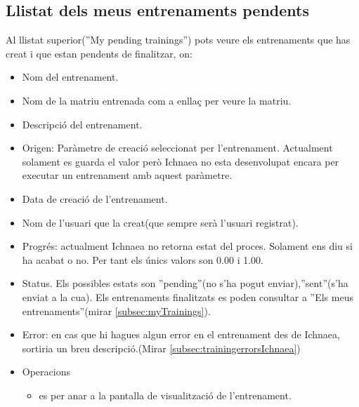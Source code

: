 \subsection{Llistat dels meus entrenaments pendents}
Al llistat superior(''My pending trainings'') pots veure els entrenaments que has creat i que estan pendents de finalitzar, on: 
\begin{itemize}
\item Nom del entrenament.
\item Nom de la matriu entrenada com a enllaç per veure la matriu.
\item Descripci\'{o} del entrenament.
\item Origen: Paràmetre de creació seleccionat per l'entrenament. Actualment solament es guarda el valor però Ichnaea no esta desenvolupat encara per executar un entrenament amb aquest paràmetre.
\item Data de creaci\'{o} de l'entrenament.
\item Nom de l'usuari que la creat(que sempre serà l'usuari registrat).
\item Progr\'{e}s: actualment Ichnaea no retorna estat del proces. Solament ens diu si ha acabat o no. Per tant els \'{u}nics valors son 0.00 i 1.00.
\item Status. Els possibles estats son ''pending''(no s'ha pogut enviar),''sent''(s'ha enviat a la cua). Els entrenaments finalitzats es poden consultar a ''Els meus entrenaments''(mirar \ref{subsec:myTrainings}).
\item Error: en cas que hi hagues algun error en el entrenament des de Ichnaea, sortiria un breu descripció.(Mirar \ref{subsec:trainingerrorsIchnaea})
\item Operacions
 \begin{itemize}
 \item \iconeyeopen es per anar a la pantalla de visualització de l'entrenament.
 \end{itemize}
\end{itemize}

